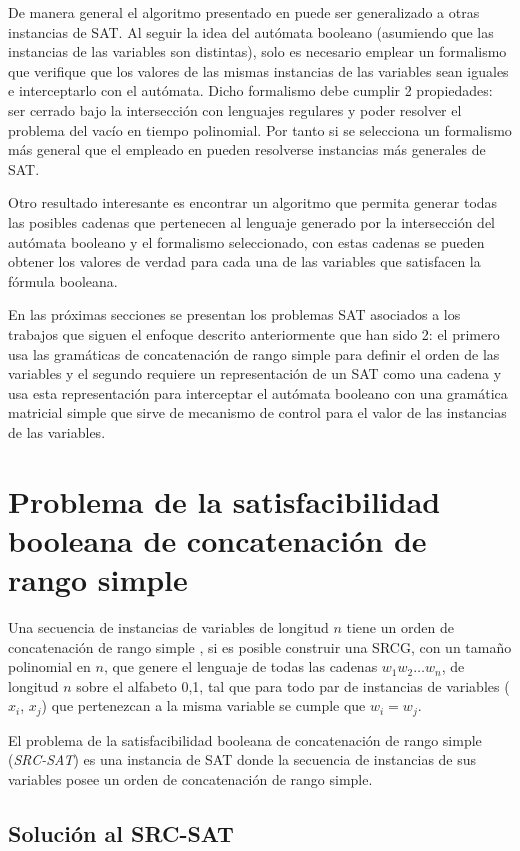De manera general el algoritmo presentado en \cite{aCFSAT} puede ser generalizado a otras instancias de SAT.
Al seguir la idea del autómata booleano (asumiendo que las instancias de las variables son distintas), solo es
necesario emplear un formalismo que verifique que los valores de las mismas instancias de las variables sean
iguales e interceptarlo con el autómata. Dicho formalismo debe cumplir 2 propiedades: ser cerrado bajo la intersección con lenguajes regulares y poder resolver el problema del vacío en tiempo polinomial. Por tanto si se selecciona un formalismo más general que el empleado en \cite{aCFSAT} pueden resolverse instancias más generales de SAT.

Otro resultado interesante es encontrar un algoritmo que permita generar todas las posibles cadenas que pertenecen al lenguaje generado por la intersección del autómata booleano y el formalismo seleccionado, con estas cadenas se pueden obtener los valores de verdad para cada una de las variables que satisfacen la fórmula booleana.

En las próximas secciones se presentan los problemas SAT asociados a los trabajos que siguen el enfoque
descrito anteriormente que han sido 2: el primero usa las gramáticas de concatenación de rango simple
para definir el orden de las variables y el segundo requiere un representación de un SAT como una
cadena y usa esta representación para interceptar el autómata booleano con una gramática matricial
simple que sirve de mecanismo de control para el valor de las instancias de las variables.
\section{Problema de la satisfacibilidad booleana de concatenación de rango simple}

Una secuencia de instancias de variables de longitud $n$ tiene un orden de concatenación de rango simple \cite{aSRCSAT},
si es posible construir una SRCG, con un tamaño polinomial en $n$, que genere el lenguaje de todas las cadenas
$w_1w_2 \ldots w_n$, de longitud $n$ sobre el alfabeto {0,1}, tal que para todo par de instancias de variables
($x_i$, $x_j$) que pertenezcan a la misma variable se cumple que $w_i = w_j$.

El problema de la satisfacibilidad booleana de concatenación de rango simple (\textit{SRC-SAT}) es una instancia de
SAT donde la secuencia de instancias de sus variables posee un orden de concatenación de rango simple.

\subsection{Solución al SRC-SAT}

